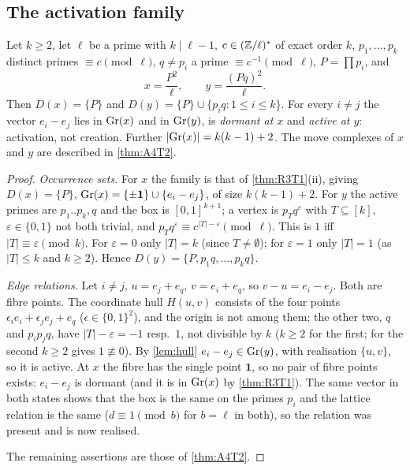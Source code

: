 \subsection{The activation family}
\begin{theorem}\label{thm:A4T1}
Let $k\ge2$, let $\ell$ be a prime with $k\mid\ell-1$, $c\in(\mathbb Z/\ell)^*$ of exact order $k$, $p_1,\dots,p_k$ distinct primes $\equiv c\pmod\ell$, $q\ne p_i$ a prime $\equiv c^{-1}\pmod\ell$, $P=\prod p_i$, and
\[
x=\frac{P^2}{\ell},\qquad y=\frac{(Pq)^2}{\ell}.
\]
Then $D(x)=\{P\}$ and $D(y)=\{P\}\cup\{p_iq:1\le i\le k\}$. For every $i\ne j$ the vector $e_i-e_j$ lies in $\mathrm{Gr}(x)$ and in $\mathrm{Gr}(y)$, is \emph{dormant at $x$} and \emph{active at $y$}: activation, not creation. Further $|\mathrm{Gr}(x)|=k(k-1)+2$. The move complexes of $x$ and $y$ are described in \cref{thm:A4T2}.
\end{theorem}
\begin{proof}
\emph{Occurrence sets.} For $x$ the family is that of \cref{thm:R3T1}(ii), giving $D(x)=\{P\}$, $\mathrm{Gr}(x)=\{\pm\mathbf 1\}\cup\{e_i-e_j\}$, of size $k(k-1)+2$. For $y$ the active primes are $p_1..p_k,q$ and the box is $[0,1]^{k+1}$; a vertex is $p_T q^\varepsilon$ with $T\subseteq[k]$, $\varepsilon\in\{0,1\}$ not both trivial, and $p_Tq^\varepsilon\equiv c^{|T|-\varepsilon}\pmod\ell$. This is $1$ iff $|T|\equiv\varepsilon\pmod k$. For $\varepsilon=0$ only $|T|=k$ (since $T\ne\emptyset$); for $\varepsilon=1$ only $|T|=1$ (as $|T|\le k$ and $k\ge2$). Hence $D(y)=\{P,p_1q,\dots,p_kq\}$.

\emph{Edge relations.} Let $i\ne j$, $u=e_j+e_q$, $v=e_i+e_q$, so $v-u=e_i-e_j$. Both are fibre points. The coordinate hull $H(u,v)$ consists of the four points $\epsilon_ie_i+\epsilon_je_j+e_q$ ($\epsilon\in\{0,1\}^2$), and the origin is not among them; the other two, $q$ and $p_ip_jq$, have $|T|-\varepsilon=-1$ resp.\ $1$, not divisible by $k$ ($k\ge2$ for the first; for the second $k\ge2$ gives $1\not\equiv0$). By \cref{lem:hull} $e_i-e_j\in\mathrm{Gr}(y)$, with realisation $\{u,v\}$, so it is active. At $x$ the fibre has the single point $\mathbf 1$, so no pair of fibre points exists: $e_i-e_j$ is dormant (and it is in $\mathrm{Gr}(x)$ by \cref{thm:R3T1}). The same vector in both states shows that the box is the same on the primes $p_i$ and the lattice relation is the same ($d\equiv1\pmod b$ for $b=\ell$ in both), so the relation was present and is now realised.

The remaining assertions are those of \cref{thm:A4T2}. \qedhere
\end{proof}
